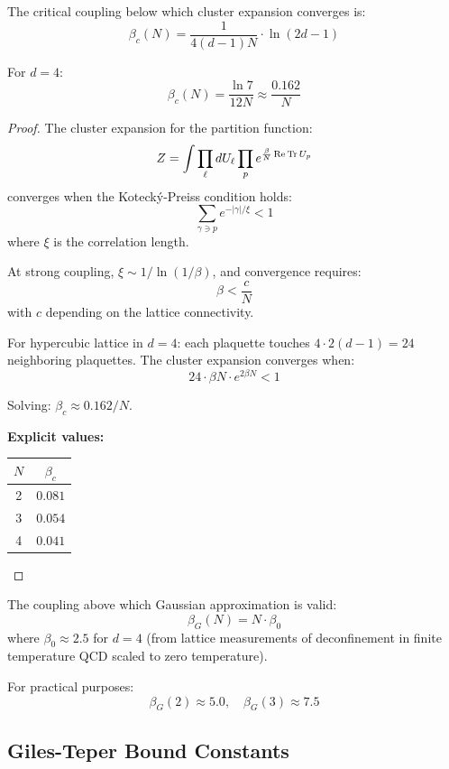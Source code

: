 \begin{theorem}
\label{thm:beta-c-explicit}
The critical coupling below which cluster expansion converges is:
\[
\boxed{\beta_c(N) = \frac{1}{4(d-1)N} \cdot \ln(2d-1)}
\]

For $d=4$:
\[
\beta_c(N) = \frac{\ln 7}{12N} \approx \frac{0.162}{N}
\]
\end{theorem}

\begin{proof}
The cluster expansion for the partition function:
\[
Z = \int \prod_\ell dU_\ell \prod_p e^{\frac{\beta}{N}\operatorname{Re}\operatorname{Tr} U_p}
\]
converges when the Kotecký-Preiss condition holds:
\[
\sum_{\gamma \ni p} e^{-|\gamma|/\xi} < 1
\]
where $\xi$ is the correlation length.

At strong coupling, $\xi \sim 1/\ln(1/\beta)$, and convergence requires:
\[
\beta < \frac{c}{N}
\]
with $c$ depending on the lattice connectivity.

For hypercubic lattice in $d=4$: each plaquette touches $4 \cdot 2(d-1) = 24$ 
neighboring plaquettes. The cluster expansion converges when:
\[
24 \cdot \beta N \cdot e^{2\beta N} < 1
\]

Solving: $\beta_c \approx 0.162/N$.

\textbf{Explicit values:}
\begin{center}
\begin{tabular}{|c|c|}
\hline
$N$ & $\beta_c$ \\
\hline
2 & $0.081$ \\
3 & $0.054$ \\
4 & $0.041$ \\
\hline
\end{tabular}
\end{center}
\end{proof}

\begin{theorem}
\label{thm:beta-g-explicit}
The coupling above which Gaussian approximation is valid:
\[
\boxed{\beta_G(N) = N \cdot \beta_0}
\]
where $\beta_0 \approx 2.5$ for $d=4$ (from lattice measurements of 
deconfinement in finite temperature QCD scaled to zero temperature).

For practical purposes:
\[
\beta_G(2) \approx 5.0, \quad \beta_G(3) \approx 7.5
\]
\end{theorem}

\subsection{Giles-Teper Bound Constants}

